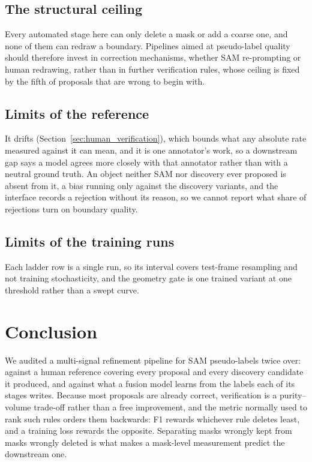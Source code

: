 \documentclass[journal]{IEEEtran}
\begin{document}
\subsection{The structural ceiling}
Every automated stage here can only delete a mask or add a coarse one, and none of them can redraw a boundary.
Pipelines aimed at pseudo-label quality should therefore invest in correction mechanisms, whether SAM re-prompting or human redrawing, rather than in further verification rules, whose ceiling is fixed by the fifth of proposals that are wrong to begin with.

\subsection{Limits of the reference}
It drifts (Section~\ref{sec:human_verification}), which bounds what any absolute rate measured against it can mean, and it is one annotator's work, so a downstream gap says a model agrees more closely with that annotator rather than with a neutral ground truth.
An object neither SAM nor discovery ever proposed is absent from it, a bias running only against the discovery variants, and the interface records a rejection without its reason, so we cannot report what share of rejections turn on boundary quality.

\subsection{Limits of the training runs}
Each ladder row is a single run, so its interval covers test-frame resampling and not training stochasticity, and the geometry gate is one trained variant at one threshold rather than a swept curve.

\section{Conclusion}

We audited a multi-signal refinement pipeline for SAM pseudo-labels twice over: against a human reference covering every proposal and every discovery candidate it produced, and against what a fusion model learns from the labels each of its stages writes.
Because most proposals are already correct, verification is a purity--volume trade-off rather than a free improvement, and the metric normally used to rank such rules orders them backwards: F1 rewards whichever rule deletes least, and a training loss rewards the opposite.
Separating masks wrongly kept from masks wrongly deleted is what makes a mask-level measurement predict the downstream one.
\end{document}
